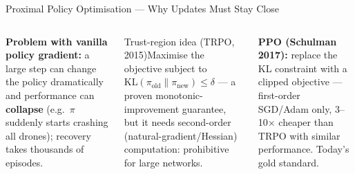 \documentclass[aspectratio=169,10pt,t]{beamer}
\begin{document}
\begin{frame}{Proximal Policy Optimisation --- Why Updates Must Stay Close}
\begin{columns}[T]
\begin{wbox}\scriptsize\textbf{Problem with vanilla policy gradient:} a large step can change the policy dramatically and performance can \textbf{collapse} (e.g.\ $\pi$ suddenly starts crashing all drones); recovery takes thousands of episodes.\end{wbox}
\begin{cbox}[ISSAnavy]{Trust-region idea (TRPO, 2015)}\scriptsize Maximise the objective subject to $\text{KL}(\pi_{\text{old}}\|\pi_{\text{new}})\le\delta$ --- a proven monotonic-improvement guarantee, but it needs second-order (natural-gradient/Hessian) computation: prohibitive for large networks.\end{cbox}
\begin{rbox}\scriptsize\textbf{PPO (Schulman 2017):} replace the KL constraint with a clipped objective --- first-order SGD/Adam only, 3--10$\times$ cheaper than TRPO with similar performance. Today's gold standard.\end{rbox}
\end{columns}
\end{frame}
\end{document}
